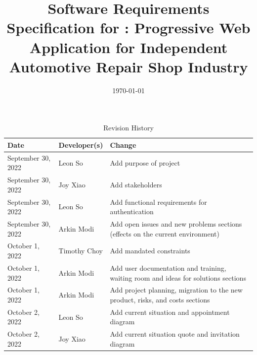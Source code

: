 \documentclass[12pt]{article}
\begin{document}
\title{Software Requirements Specification for \progname: Progressive Web Application for Independent
	Automotive Repair Shop Industry}
\author{\authname}
\date{\today}

\maketitle

\newpage


\tableofcontents

\newpage

\listoftables

\listoffigures

\newpage

\begin{table}[H]
	\caption{Revision History} \label{TblRevisionHistory}
	\begin{tabularx}{\textwidth}{llX}
		\toprule
		\textbf{Date}      & \textbf{Developer(s)} & \textbf{Change}                                                                    \\
		\midrule
		September 30, 2022 & Leon So               & Add purpose of project                                                             \\
		September 30, 2022 & Joy Xiao              & Add stakeholders                                                                   \\
		September 30, 2022 & Leon So               & Add functional requirements for authentication                                     \\
		September 30, 2022 & Arkin Modi            & Add open issues and new problems sections (effects on the current environment)     \\
		October 1, 2022    & Timothy Choy          & Add mandated constraints                                                           \\
		October 1, 2022    & Arkin Modi            & Add user documentation and training, waiting room and ideas for solutions sections \\
		October 1, 2022    & Arkin Modi            & Add project planning, migration to the new product, risks, and costs sections      \\
		October 2, 2022    & Leon So               & Add current situation and appointment diagram                                      \\
		October 2, 2022    & Joy Xiao              & Add current situation quote and invitation diagram                                 \\

\end{tabularx}
\end{table}
\end{document}
